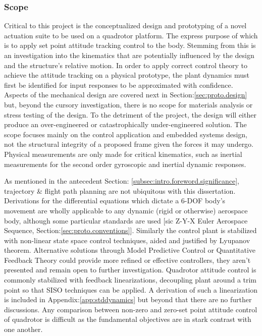 \subsubsection{Scope}
\label{subsubsec:intro.foreword.scope}
Critical to this project is the conceptualized design and prototyping of a novel actuation suite to be used on a quadrotor platform. The express purpose of which is to apply set point attitude tracking control to the body. Stemming from this is an investigation into the kinematics that are potentially influenced by the design and the structure's relative motion. In order to apply correct control theory to achieve the attitude tracking on a physical prototype, the plant dynamics must first be identified for input responses to be approximated with confidence. Aspects of the mechanical design are covered next in Section:\ref{sec:proto.design} but, beyond the cursory investigation, there is no scope for materials analysis or stress testing of the design. To the detriment of the project, the design will either produce an over-engineered or catastrophically under-engineered solution. The scope focuses mainly on the control application and embedded systems design, not the structural integrity of a proposed frame given the forces it may undergo. Physical measurements are only made for critical kinematics, such as inertial measurements for the second order gyroscopic and inertial dynamic responses.
\par
As mentioned in the antecedent Section: \ref{subsec:intro.foreword.significance}, trajectory \& flight path planning are not ubiquitous with this dissertation. Derivations for the differential equations which dictate a 6-DOF body's movement are wholly applicable to any dynamic (rigid or otherwise) aerospace body, although some particular standards are used [sic Z-Y-X Euler Aerospace Sequence, Section:\ref{sec:proto.conventions}]. Similarly the control plant is stabilized with non-linear state space control techniques, aided and justified by Lyupanov theorem. Alternative solutions through Model Predictive Control or Quantitative Feedback Theory could provide more refined or effective controllers, they aren't presented and remain open to further investigation. Quadrotor attitude control is commonly stabilized with feedback linearizations, decoupling plant around a trim point so that SISO techniques can be applied. A derivation of such a linearization is included in Appendix:\ref{app:stddynamics} but beyond that there are no further discussions. Any comparison between non-zero and zero-set point attitude control of quadrotor is difficult as the fundamental objectives are in stark contrast with one another.
